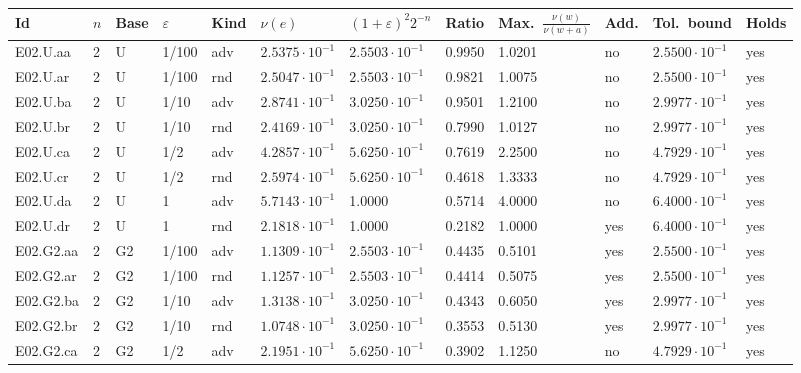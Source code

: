 {\scriptsize\setlength{\tabcolsep}{2.5pt}
\begin{longtable}{@{}lllllllllll l@{}}
\toprule
Id & $n$ & Base & $\varepsilon$ & Kind & $\nu(e)$ & $(1{+}\varepsilon)^2 2^{-n}$ & Ratio & Max.\ $\frac{\nu(w)}{\nu(w+a)}$ & Add. & Tol.\ bound & Holds \\
\midrule\endhead
\bottomrule\endfoot
E02.U.aa & 2 & U & 1/100 & adv & $2.5375\cdot 10^{-1}$ & $2.5503\cdot 10^{-1}$ & 0.9950 & 1.0201 & no & $2.5500\cdot 10^{-1}$ & yes \\
E02.U.ar & 2 & U & 1/100 & rnd & $2.5047\cdot 10^{-1}$ & $2.5503\cdot 10^{-1}$ & 0.9821 & 1.0075 & no & $2.5500\cdot 10^{-1}$ & yes \\
E02.U.ba & 2 & U & 1/10 & adv & $2.8741\cdot 10^{-1}$ & $3.0250\cdot 10^{-1}$ & 0.9501 & 1.2100 & no & $2.9977\cdot 10^{-1}$ & yes \\
E02.U.br & 2 & U & 1/10 & rnd & $2.4169\cdot 10^{-1}$ & $3.0250\cdot 10^{-1}$ & 0.7990 & 1.0127 & no & $2.9977\cdot 10^{-1}$ & yes \\
E02.U.ca & 2 & U & 1/2 & adv & $4.2857\cdot 10^{-1}$ & $5.6250\cdot 10^{-1}$ & 0.7619 & 2.2500 & no & $4.7929\cdot 10^{-1}$ & yes \\
E02.U.cr & 2 & U & 1/2 & rnd & $2.5974\cdot 10^{-1}$ & $5.6250\cdot 10^{-1}$ & 0.4618 & 1.3333 & no & $4.7929\cdot 10^{-1}$ & yes \\
E02.U.da & 2 & U & 1 & adv & $5.7143\cdot 10^{-1}$ & 1.0000 & 0.5714 & 4.0000 & no & $6.4000\cdot 10^{-1}$ & yes \\
E02.U.dr & 2 & U & 1 & rnd & $2.1818\cdot 10^{-1}$ & 1.0000 & 0.2182 & 1.0000 & yes & $6.4000\cdot 10^{-1}$ & yes \\
E02.G2.aa & 2 & G2 & 1/100 & adv & $1.1309\cdot 10^{-1}$ & $2.5503\cdot 10^{-1}$ & 0.4435 & 0.5101 & yes & $2.5500\cdot 10^{-1}$ & yes \\
E02.G2.ar & 2 & G2 & 1/100 & rnd & $1.1257\cdot 10^{-1}$ & $2.5503\cdot 10^{-1}$ & 0.4414 & 0.5075 & yes & $2.5500\cdot 10^{-1}$ & yes \\
E02.G2.ba & 2 & G2 & 1/10 & adv & $1.3138\cdot 10^{-1}$ & $3.0250\cdot 10^{-1}$ & 0.4343 & 0.6050 & yes & $2.9977\cdot 10^{-1}$ & yes \\
E02.G2.br & 2 & G2 & 1/10 & rnd & $1.0748\cdot 10^{-1}$ & $3.0250\cdot 10^{-1}$ & 0.3553 & 0.5130 & yes & $2.9977\cdot 10^{-1}$ & yes \\
E02.G2.ca & 2 & G2 & 1/2 & adv & $2.1951\cdot 10^{-1}$ & $5.6250\cdot 10^{-1}$ & 0.3902 & 1.1250 & no & $4.7929\cdot 10^{-1}$ & yes \\

\end{longtable}}
